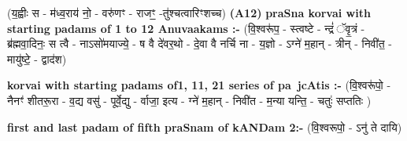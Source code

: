 \documentclass[17pt]{extarticle}
\begin{document}
                  \newline
                      (य॒ह्वीः स - म॑ध्व॒राय॑ नो॒ - वरु॑णꣳ - राजꣳ॒॒ -तु॑श्चत्वारिꣳशच्च)  \textbf{(A12)} \newline \newline
                \textbf{praSna korvai with starting padams of 1 to 12 Anuvaakams :-} \newline
        (वि॒श्वरू॑प॒ - स्त्वष्टे - न्द्रं॑ ॅवृ॒त्रं - ब्र॑ह्मवा॒दिनः॒ स त्वै - नाऽसो॑मयाज्ये॒ - ष वै दे॑वर॒थो - दे॒वा वै नर्चि ना - य॒ज्ञो - ऽग्ने॑ म॒हान् - त्रीन् - निवी॑त॒ - मायु॑ष्टे॒ - द्वाद॑श) \newline

        \textbf{korvai with starting padams of1, 11, 21 series of pa~jcAtis :-} \newline
        (वि॒श्वरू॑पो॒ - नैनꣳ॑ शीतरू॒रा - व॒द्य वसु॑ - पूर्वे॒द्यु - र्वाजा॒ इत्य - ग्ने॑ म॒हान् - निवी॑त - म॒न्या यन्ति॒ - चतुः॑ सप्ततिः ) \newline

        \textbf{first and last padam of fifth praSnam of kANDam 2:-} \newline
        (वि॒श्वरूपो॒ - ऽनु॑ ते दायि) \newline 
\end{document}
